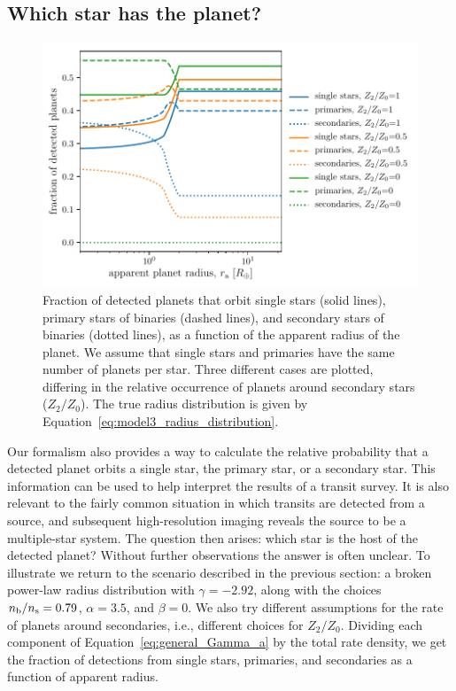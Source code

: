 \documentclass[12pt,modern,trackchanges]{aastex61}
\newcommand{\s}{_{\rm s}}
\renewcommand{\b}{_{\rm b}}
\begin{document}
\subsection{Which star has the planet?}
\label{subsec:whichstar}
\begin{figure}[!t]
    \centering
    \includegraphics[width=\textwidth]{f5.pdf}
    \caption{ Fraction of detected planets that orbit single stars
      (solid lines), primary stars of binaries (dashed lines), and
      secondary stars of binaries (dotted lines), as a function of the
      apparent radius of the planet.  We assume that single stars and
      primaries have the same number of planets per star.  Three
      different cases are plotted, differing in the relative
      occurrence of planets around secondary stars ($Z_2/Z_0$).  The
      true radius distribution is given by
      Equation~\ref{eq:model3_radius_distribution}.}
    \label{fig:frac_model_3}
\end{figure}

Our formalism also provides a way to calculate the relative
probability that a detected planet orbits a single star, the primary
star, or a secondary star.  This information can be used to help
interpret the results of a transit survey.  It is also relevant to the
fairly common situation in which transits are detected from a source,
and subsequent high-resolution imaging reveals the source to be a
multiple-star system.  The question then arises: which star is the
host of the detected planet?  Without further observations the answer
is often unclear.  To illustrate we return to the scenario described
in the previous section: a broken power-law radius distribution with
$\gamma=-2.92$, along with the choices $n\b/n\s=0.79$, $\alpha = 3.5$,
and $\beta=0$.  We also try different assumptions for the rate of
planets around secondaries, i.e., different choices for $Z_2/Z_0$.
Dividing each component of Equation~\ref{eq:general_Gamma_a} by the
total rate density, we get the fraction of detections from single
stars, primaries, and secondaries as a function of apparent radius.
\end{document}
